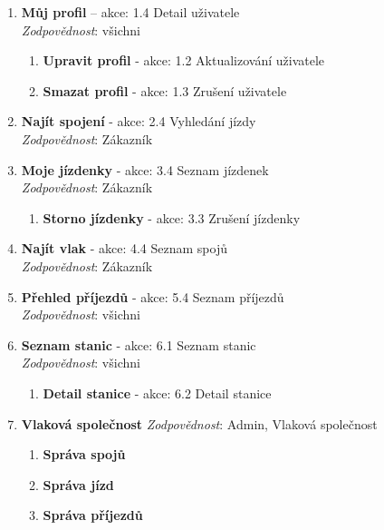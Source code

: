 \documentclass[11pt]{article}
\begin{document}
\begin{enumerate}
    \item \textbf{Můj profil} – akce: 1.4 Detail uživatele\\
        \textit{Zodpovědnost}: všichni
        \begin{enumerate}
            \item \textbf{Upravit profil} - akce: 1.2 Aktualizování uživatele
            \item \textbf{Smazat profil} - akce: 1.3 Zrušení uživatele
        \end{enumerate}

    \item \textbf{Najít spojení} - akce: 2.4 Vyhledání jízdy\\
        \textit{Zodpovědnost}: Zákazník

    \item \textbf{Moje jízdenky} - akce: 3.4 Seznam jízdenek\\
        \textit{Zodpovědnost}: Zákazník
        \begin{enumerate}
            \item \textbf{Storno jízdenky} - akce: 3.3 Zrušení jízdenky
        \end{enumerate}
    
    \item \textbf{Najít vlak} - akce: 4.4 Seznam spojů\\
        \textit{Zodpovědnost}: Zákazník

    \item \textbf{Přehled příjezdů} - akce: 5.4 Seznam příjezdů\\
        \textit{Zodpovědnost}: všichni

    \item \textbf{Seznam stanic} - akce: 6.1 Seznam stanic\\
        \textit{Zodpovědnost}: všichni
        \begin{enumerate}
            \item \textbf{Detail stanice} - akce: 6.2 Detail stanice
        \end{enumerate}

    \item \textbf{Vlaková společnost}
        \textit{Zodpovědnost}: Admin, Vlaková společnost
        \begin{enumerate}
            \item \textbf{Správa spojů}
            \item \textbf{Správa jízd}
            \item \textbf{Správa příjezdů}
        \end{enumerate}
    

\end{enumerate}
\end{document}
